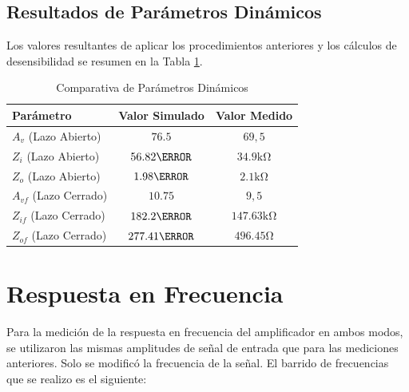 \subsection{Resultados de Parámetros Dinámicos}
Los valores resultantes de aplicar los procedimientos anteriores y los cálculos de desensibilidad se resumen en la Tabla \ref{tab:parametros}.

\begin{table}[!ht]
    \centering
    \begin{tabular}{|l|c|c|}
        \hline
        \textbf{Parámetro}  & \textbf{Valor Simulado} & \textbf{Valor Medido} \\ \hline
        $A_v$ (Lazo Abierto) & $76.5$ & $69,5$ \\ \hline
        $Z_i$ (Lazo Abierto) & $56.82 \kohm$ & $34.9 \si{\kilo\ohm}$ \\ \hline
        $Z_o$ (Lazo Abierto) & $1.98 \kohm$ & $2.1 \si{\kilo\ohm}$ \\ \hline
        $A_{vf}$ (Lazo Cerrado) & $10.75$ & $9,5$ \\ \hline
        $Z_{if}$ (Lazo Cerrado) & $182.2 \kohm$ & $147.63 \si{\kilo\ohm}$ \\ \hline
        $Z_{of}$ (Lazo Cerrado) & $277.41 \ohm$ & $496.45 \si{\ohm}$ \\ \hline
    \end{tabular}
    \caption{Comparativa de Parámetros Dinámicos}
    \label{tab:parametros}
\end{table}


\section{Respuesta en Frecuencia}
Para la medición de la respuesta en frecuencia del amplificador en ambos modos, se utilizaron las mismas amplitudes de
señal de entrada que para las mediciones anteriores. Solo se modificó la frecuencia de la señal. El barrido de
frecuencias que se realizo es el siguiente:

